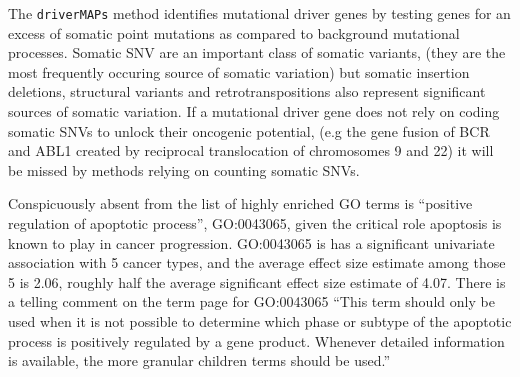 











The \texttt{driverMAPs} method identifies mutational driver genes by testing genes for an excess of somatic point mutations as compared to background mutational processes. Somatic SNV are an important class of somatic variants, (they are the most frequently occuring source of somatic variation) but somatic insertion deletions, structural variants and retrotranspositions also represent significant sources of somatic variation\cite{PANCAN}.  If a mutational driver gene does not rely on coding somatic SNVs to unlock their oncogenic potential, (e.g the gene fusion of BCR and ABL1 created by reciprocal translocation of chromosomes 9 and 22\cite{philly}) it will be missed by methods relying on counting somatic SNVs.


Conspicuously absent from the list of highly enriched GO terms is ``positive regulation of apoptotic process'', GO:0043065, given the critical role apoptosis is known to play in cancer
progression\cite{Hanahan_2011}. GO:0043065 is has a significant univariate association with 5 cancer types, and the average effect size estimate among those 5 is 2.06, roughly half the average significant effect size estimate of 4.07.
There is a telling comment on the term page for GO:0043065 ``This term should only be used when it is not possible to determine which phase or subtype of the apoptotic process is positively regulated by a gene product. Whenever detailed
information is available, the more granular children terms should be used.''

